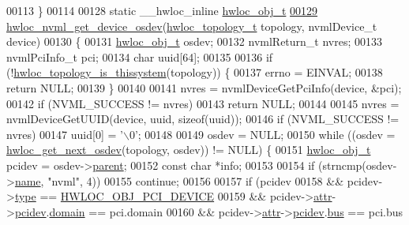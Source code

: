 \begin{DoxyCode}
{00113 \}
00114 
00128 \textcolor{keyword}{static} \_\_hwloc\_inline \hyperlink{a00238}{hwloc\_obj\_t}
\hyperlink{a00221_gaf176159b5760a191871eff23f5a69ee9}{00129} \hyperlink{a00221_gaf176159b5760a191871eff23f5a69ee9}{hwloc\_nvml\_get\_device\_osdev}(\hyperlink{a00186_ga9d1e76ee15a7dee158b786c30b6a6e38}{hwloc\_topology\_t} topology, 
      nvmlDevice\_t device)
00130 \{
00131         \hyperlink{a00238}{hwloc\_obj\_t} osdev;
00132         nvmlReturn\_t nvres;
00133         nvmlPciInfo\_t pci;
00134         \textcolor{keywordtype}{char} uuid[64];
00135 
00136         \textcolor{keywordflow}{if} (!\hyperlink{a00193_ga68ffdcfd9175cdf40709801092f18017}{hwloc\_topology\_is\_thissystem}(topology)) \{
00137                 errno = EINVAL;
00138                 \textcolor{keywordflow}{return} NULL;
00139         \}
00140 
00141         nvres = nvmlDeviceGetPciInfo(device, &pci);
00142         \textcolor{keywordflow}{if} (NVML\_SUCCESS != nvres)
00143                 \textcolor{keywordflow}{return} NULL;
00144 
00145         nvres = nvmlDeviceGetUUID(device, uuid, \textcolor{keyword}{sizeof}(uuid));
00146         \textcolor{keywordflow}{if} (NVML\_SUCCESS != nvres)
00147                 uuid[0] = \textcolor{charliteral}{'\(\backslash\)0'};
00148 
00149         osdev = NULL;
00150         \textcolor{keywordflow}{while} ((osdev = \hyperlink{a00204_ga8b4584c8949e2c5f1c97ba7fe92b8145}{hwloc\_get\_next\_osdev}(topology, osdev)) != NULL) \{
00151                 \hyperlink{a00238}{hwloc\_obj\_t} pcidev = osdev->\hyperlink{a00238_adc494f6aed939992be1c55cca5822900}{parent};
00152                 \textcolor{keyword}{const} \textcolor{keywordtype}{char} *info;
00153 
00154                 \textcolor{keywordflow}{if} (strncmp(osdev->\hyperlink{a00238_abb709ec38f2970677e4e57d1d30be96d}{name}, \textcolor{stringliteral}{"nvml"}, 4))
00155                         \textcolor{keywordflow}{continue};
00156 
00157                 \textcolor{keywordflow}{if} (pcidev
00158                     && pcidev->\hyperlink{a00238_acc4f0803f244867e68fe0036800be5de}{type} == \hyperlink{a00184_ggacd37bb612667dc437d66bfb175a8dc55a5d8117a54df1fbd3606ab19e42cb0ea9}{HWLOC\_OBJ\_PCI\_DEVICE}
00159                     && pcidev->\hyperlink{a00238_accd40e29f71f19e88db62ea3df02adc8}{attr}->\hyperlink{a00242_a4203d713ce0f5beaa6ee0e9bdac70828}{pcidev}.\hyperlink{a00262_a8fba44988deb98613c1505a4019a34dc}{domain} == pci.domain
00160                     && pcidev->\hyperlink{a00238_accd40e29f71f19e88db62ea3df02adc8}{attr}->\hyperlink{a00242_a4203d713ce0f5beaa6ee0e9bdac70828}{pcidev}.\hyperlink{a00262_aae99e035e8d1387d7b8768aaa8eceb0a}{bus} == pci.bus
}
\end{DoxyCode}
